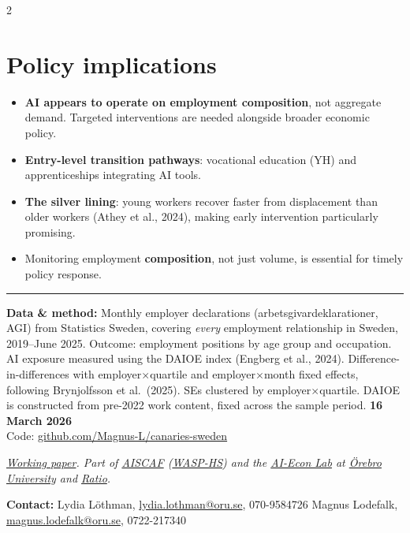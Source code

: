 \documentclass[10pt,a4paper]{article}
\begin{document}
\begin{multicols}{2}
\section{Policy implications}
\begin{itemize}[leftmargin=*, itemsep=1pt, parsep=0pt, topsep=0pt]
  \item \textbf{AI appears to operate on employment composition}, not
        aggregate demand. Targeted interventions are needed alongside
        broader economic policy.
  \item \textbf{Entry-level transition pathways}: vocational education
        (YH) and apprenticeships integrating AI tools.
  \item \textbf{The silver lining}: young workers recover
        faster from displacement than older workers (Athey et al., 2024),
        making early intervention particularly promising.
  \item Monitoring employment \textbf{composition}, not just
        volume, is essential for timely policy response.
\end{itemize}

\end{multicols}

\vspace{-0.1cm}
\noindent\textcolor{darkblue}{\rule{\textwidth}{0.4pt}}
\vspace{0.04cm}

\noindent
{\scriptsize\color{medgray}
\textbf{Data \& method:} Monthly employer declarations (arbetsgivardeklarationer, AGI) from
Statistics Sweden, covering \emph{every} employment relationship in Sweden, 2019--June 2025.
Outcome: employment positions by age group and occupation.
AI exposure measured using the DAIOE index
(Engberg et al., 2024). Difference-in-differences with employer$\times$quartile
and employer$\times$month fixed effects, following Brynjolfsson et al.\ (2025).
SEs clustered by employer$\times$quartile.
DAIOE is constructed from pre-2022 work content, fixed across the sample period.
\hfill \textbf{16 March 2026}\\[1pt]
\hfill Code: \href{https://github.com/Magnus-L/canaries-sweden}{github.com/Magnus-L/canaries-sweden}}

\vspace{0.04cm}
\noindent
{\scriptsize\color{medgray}
\textit{\href{https://www.ai-econlab.com/papers}{Working paper}.
Part of \href{https://www.aiscaf.se/w/ac/}{AISCAF} (\href{https://wasp-hs.org}{WASP-HS}) and the \href{https://www.ai-econlab.com}{AI-Econ Lab} at \href{https://www.oru.se}{\"Orebro University} and \href{https://ratio.se}{Ratio}.}}

\noindent
{\scriptsize\color{medgray}
\textbf{Contact:}
Lydia L\"othman, \href{mailto:lydia.lothman@oru.se}{lydia.lothman@oru.se}, 070-9584726
\;\textbullet\;
Magnus Lodefalk, \href{mailto:magnus.lodefalk@oru.se}{magnus.lodefalk@oru.se}, 0722-217340}
\end{document}
